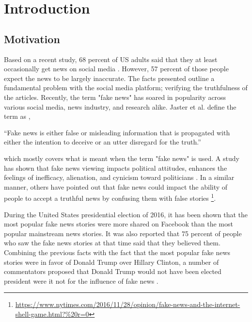 \chapter{Introduction}\label{introduction}

\section{Motivation}\label{intro:motivation}

Based on a recent study, 68 percent of US adults said that they at least occasionally get news on social media \cite{matsa2018news}. However, 57 percent of those people expect the news to be largely inaccurate. The facts presented outline a fundamental problem with the social media platform; verifying the truthfulness of the articles. Recently, the term "fake news" has soared in popularity across various social media, news industry, and research alike. Jaster et al. define the term as \cite{jasterfake},

\enquote{Fake news is either false or misleading information that is propagated with either the intention to deceive or an utter disregard for the truth.}

which mostly covers what is meant when the term "fake news" is used. A study has shown that fake news viewing impacts political attitudes, enhances the feelings of inefficacy, alienation, and cynicism toward politicians \cite{balmas2014fake}. In a similar manner, others have pointed out that fake news could impact the ability of people to accept a truthful news by confusing them with false stories \footnote{\url{https://www.nytimes.com/2016/11/28/opinion/fake-news-and-the-internet-shell-game.html?\%20r=0}}.

During the United States presidential election of 2016, it has been shown that the most popular fake news stories were more shared on Facebook than the most popular mainstream news stories\cite{silverman2016analysis}. It was also reported that 75 percent of people who saw the fake news stories at that time said that they believed them\cite{silverman2016most}. Combining the previous facts with the fact that the most popular fake news stories were in favor of Donald Trump over Hillary Clinton\cite{silverman2016analysis}, a number of commentators proposed that Donald Trump would not have been elected president were it not for the influence of fake news \cite{parkinson2016click} \cite{read2016donald} \cite{dewey2016facebook}.

